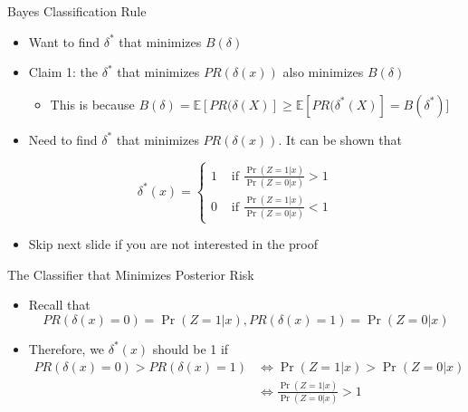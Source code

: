 \documentclass[
  ignorenonframetext,
]{beamer}
\providecommand{\tightlist}{%
  \setlength{\itemsep}{0pt}\setlength{\parskip}{0pt}}
\begin{document}
\begin{frame}{Bayes Classification Rule}
\protect\hypertarget{bayes-classification-rule}{}
\begin{itemize}
\tightlist
\item
  Want to find \(\delta^*\) that minimizes \(B(\delta)\)
\item
  Claim 1: the \(\delta^*\) that minimizes \(PR(\delta(x))\) also
  minimizes \(B(\delta)\)

  \begin{itemize}
  \tightlist
  \item
    This is because
    \(B(\delta)=\mathbb E[PR(\delta(X)]\ge \mathbb E[PR(\delta^*(X)]=B(\delta^*)\){]}
  \end{itemize}
\item
  Need to find \(\delta^*\) that minimizes \(PR(\delta(x))\). It can be
  shown that
\end{itemize}

\[\delta^*(x)=\left\{
\begin{array}{cc}
1 & \mbox{ if } \frac{\Pr(Z=1|x)}{\Pr(Z=0|x)}>1\\
0 & \mbox{ if } \frac{\Pr(Z=1|x)}{\Pr(Z=0|x)}<1
\end{array}\right.\]

\begin{itemize}
\tightlist
\item
  Skip next slide if you are not interested in the proof
\end{itemize}
\end{frame}

\begin{frame}{The Classifier that Minimizes Posterior Risk}
\protect\hypertarget{the-classifier-that-minimizes-posterior-risk}{}
\begin{itemize}
\tightlist
\item
  Recall that \[PR(\delta(x)=0)=\Pr(Z=1|x), PR(\delta(x)=1)=\Pr(Z=0|x)\]
\item
  Therefore, we \(\delta^*(x)\) should be 1 if \[\begin{aligned}
  PR(\delta(x)=0)>PR(\delta(x)=1) &\Leftrightarrow \Pr(Z=1|x)> \Pr(Z=0|x)\\
  &\Leftrightarrow \frac{\Pr(Z=1|x)}{\Pr(Z=0|x)}>1
  \end{aligned}\]
\end{itemize}
\end{frame}
\end{document}
